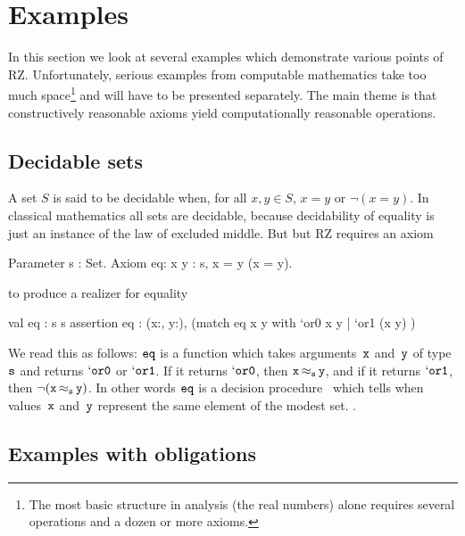\section{Examples}
\label{sec:examples}

In this section we look at several examples which demonstrate various
points of RZ. Unfortunately, serious examples from computable
mathematics take too much space\footnote{The most basic structure
  in analysis (the real numbers) alone 
  requires several operations and a dozen or more axioms.} and will have to
be presented separately. The main theme is that constructively
reasonable axioms yield computationally reasonable operations.

\subsection{Decidable sets}
\label{sec:decidable-sets}

A set $S$ is said to be decidable when, for all $x, y \in S$, $x = y$
or $\lnot (x = y)$. In classical mathematics all sets are decidable, 
\iflong
because decidability of equality is just an instance of the law of
excluded middle.  But
\else
but
\fi %
RZ requires an axiom
%
\begin{source}
Parameter s : Set.
Axiom eq: \iForall x y : s, x = y \iOr \iNot (x = y).
\end{source}
%
to produce a realizer for equality
%
\begin{source}
val eq : s \iTo s \iTo [`or0 | `or1]
assertion eq : \iForall (x:, y:), (match eq x y with
                                           `or0 \iImply x  y
                                         | `or1 \iImply \iNot (x  y) )
\end{source}
%
We read this as follows: $\f{eq}$ is a function which takes
arguments~$\f{x}$ and~$\f{y}$ of type~$\f{s}$ and returns
$\mathtt{`or0}$ or $\mathtt{`or1}$. If it returns $\mathtt{`or0}$,
then $\oper{\f{s}}{\f{x}}{\f{y}}$, and if it returns
$\mathtt{`or1}$, then $\onot{(\oper{\f{s}}{\f{x}}{\f{y}})}$. In
other words $\f{eq}$ is a decision procedure%
\iflong\ 
which tells when
values~$\f{x}$ and~$\f{y}$ represent the same element of the modest
set.
\else %
.
\fi %

\iflong
\subsection{Examples with obligations}
\label{sec:exampl-with-oblig}

